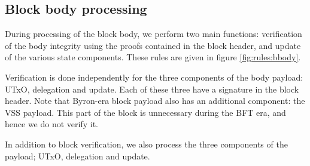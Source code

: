 \documentclass[11pt,a4paper]{article}
\begin{document}
\clearpage

\subsection{Block body processing}

During processing of the block body, we perform two main functions: verification
of the body integrity using the proofs contained in the block header, and update
of the various state components. These rules are given in figure
\ref{fig:rules:bbody}.

Verification is done independently for the three components of the body payload:
UTxO, delegation and update. Each of these three have a signature in the block
header. Note that Byron-era block payload also has an additional component: the
VSS payload. This part of the block is unnecessary during the BFT era, and hence
we do not verify it.

In addition to block verification, we also process the three components of the
payload; UTxO, delegation and update.
\end{document}

